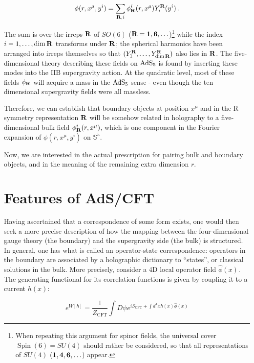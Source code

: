 \begin{equation}
	\phi(r,x^\mu,y^i) = \sum_{\mathbf{R},i}  \phi_{\mathbf{R}}^i(r,x^\mu) Y^{\mathbf{R}}_i (y^i)\,.
	\label{}
\end{equation}

The sum is over the irreps $\mathbf{R}$ of $SO(6)$ ($\mathbf{R} = \mathbf{1}, \mathbf{6}, \ldots$)\footnote{When repeating this argument for spinor fields, the universal cover $\operatorname{Spin}(6) = SU(4)$ should rather be considered, so that all representations of $SU(4)$ ($\mathbf{1}, \mathbf{4},\mathbf{6}, \ldots$) appear.} while the index $i = 1,\ldots,\dim \mathbf{R}$ transforms under $\mathbf{R}$; the spherical harmonics have been arranged into irreps themselves so that $(Y^{\mathbf{R}}_1, \ldots, Y^{\mathbf{R}}_{\dim \mathbf{R}} ) $ also lies in $\mathbf{R}$. The five-dimensional theory describing these fields on $\operatorname{AdS}_{5}$ is found by inserting these modes into the IIB supergravity action. At the quadratic level, most of these fields $\phi_{\mathbf{R}}$ will acquire a mass in the $\operatorname{AdS}_{5}$ sense - even though the ten dimensional supergravity fields were all massless.

Therefore, we can establish that boundary objects at position $x^\mu$ and in the R-symmetry representation $\mathbf{R}$ will be somehow related in holography to a five-dimensional bulk field $\phi^i_{\mathbf{R}} (r,x^\mu)$, which is one component in the Fourier expansion of $\phi(r,x^\mu,y^i)$ on $\mathbb{S}^5$.

Now, we are interested in the actual prescription for pairing bulk and boundary objects, and in the meaning of the remaining extra dimension $r$.

\section{Features of AdS/CFT}

Having ascertained that a correspondence of some form exists, one would then seek a more precise description of how the mapping between the four-dimensional gauge theory (the boundary) and the supergravity side (the bulk) is structured. In general, one has what is called an operator-state correspondence: operators in the boundary are associated by a holographic dictionary to ``states'', or classical solutions in the bulk. More precisely, consider a 4D local operator field $\hat \phi(x)$. The generating functional for its correlation functions is given by coupling it to a current $h(x)$:

\begin{equation}
	e^{W[h]} = \frac{1}{Z_\text{CFT}}\int D\psi e^{i S_\text{CFT} + \int d^4 x h(x) \hat \phi(x)}
\end{equation}

